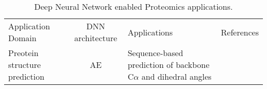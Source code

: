 \begin{table}[h!]
\centering
\begin{tabular}{|| l | c | l | l ||}
    \hline
    Application Domain & DNN architecture & Applications & References \\
    Preotein structure prediction & AE & Sequence-based prediction of backbone C$\alpha$ and dihedral angles & \\
    \hline
\end{tabular}
\caption{Deep Neural Network enabled Proteomics applications.}
\label{tab:PS-DNN}
\end{table}